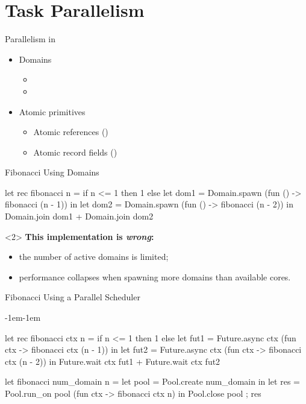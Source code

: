 \section{Task Parallelism}

\begin{frame}{Parallelism in \OCamlFive}
\Large
\begin{itemize}
  \setlength\itemsep{2em}
  \item
    Domains
    \begin{itemize}
      \item {}
      \item {}
    \end{itemize}
  \item
    Atomic primitives
    \begin{itemize}
      \item Atomic references ()
      \item Atomic record fields ()
    \end{itemize}
\end{itemize}
\end{frame}

\begin{frame}[fragile]{Fibonacci Using Domains}
\large
\begin{ocamlcode}
let rec fibonacci n =
  if n <= 1 then
    1
  else
    let dom1 = Domain.spawn (fun () -> fibonacci (n - 1)) in
    let dom2 = Domain.spawn (fun () -> fibonacci (n - 2)) in
    Domain.join dom1 + Domain.join dom2
\end{ocamlcode}
\begin{overbox}<2>
  \Large
  \textbf{This implementation is \emph{wrong}:}
  \begin{itemize}
    \item the number of active domains is limited;
    \item performance collapses when spawning more domains than available cores.
  \end{itemize}
\end{overbox}
\end{frame}

\begin{frame}[fragile]{Fibonacci Using a Parallel Scheduler}
\begin{adjustwidth}{-1em}{-1em}
\large
\begin{ocamlcode}
let rec fibonacci ctx n =
  if n <= 1 then
    1
  else
    let fut1 = Future.async ctx (fun ctx -> fibonacci ctx (n - 1)) in
    let fut2 = Future.async ctx (fun ctx -> fibonacci ctx (n - 2)) in
    Future.wait ctx fut1 + Future.wait ctx fut2

let fibonacci num_domain n =
  let pool = Pool.create num_domain in
  let res = Pool.run_on pool (fun ctx -> fibonacci ctx n) in
  Pool.close pool ;
  res
\end{ocamlcode}
\end{adjustwidth}
\end{frame}

